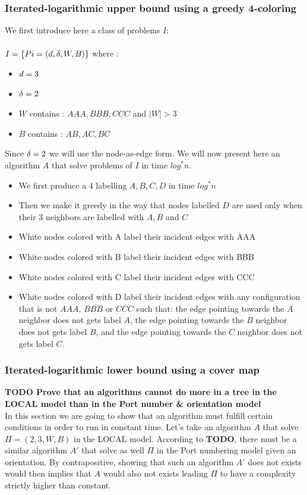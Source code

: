 

\subsubsection{Iterated-logarithmic upper bound using a greedy 4-coloring}
We first introduce here a class of problems $I$:\\\\
$I = \{Pi = (d,\delta,W,B)\}$ where :
\begin{itemize}
    \item $d = 3$
    \item $\delta = 2$
    \item $W$ contains : $AAA,BBB,CCC$ and $|W| > 3$
    \item $B$ contains : $AB,AC,BC$
\end{itemize}
Since $\delta = 2$ we will use the node-as-edge form.
We will now present here an algorithm $A$ that solve problems of $I$ in time $log^*n$.
\begin{itemize}
    \item We first produce a 4 labelling $A,B,C,D$ in time $log^*n$ 
    \item Then we make it greedy in the way that nodes labelled $D$ are used only when their 3 neighbors are labelled with $A,B$ and $C$
    \item White nodes colored with A label their incident edges with AAA
    \item White nodes colored with B label their incident edges with BBB
    \item White nodes colored with C label their incident edges with CCC
    \item White nodes colored with D label their incident edges with any configuration that is not $AAA$, $BBB$ or $CCC$ such that: the edge pointing towards the $A$ neighbor does not gets label $A$, the edge pointing towards the $B$ neighbor does not gets label $B$, and the edge pointing towards the $C$ neighbor does not gets label $C$.\\
\end{itemize}

\subsubsection{Iterated-logarithmic lower bound using a cover map}
\textbf{TODO Prove that an algorithms cannot do more in a tree in the LOCAL model than in the Port number \& orientation model}\\
In this section we are going to show that an algorithm must fulfill certain conditions in order to run in constant time.
Let's take an algorithm $A$ that solve $\Pi = (2,3,W,B)$ in the LOCAL model. According to \textbf{TODO}, there must be a similar algorithm $A'$ that solve as well $\Pi$ in the Port numbering model given an orientation. By contrapositive, showing that such an algorithm $A'$ does not exists would then implies that $A$ would also not exists leading $\Pi$ to have a complexity strictly higher than constant.\\\\

